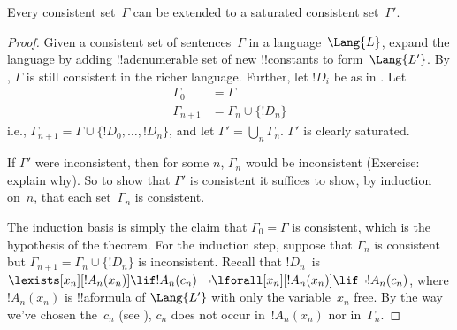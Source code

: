 \documentclass[../../../include/open-logic-section]{subfiles}
\begin{document}
\begin{lem}
Every consistent set~$\Gamma$ can be extended to a saturated
consistent set~$\Gamma'$.
\end{lem}

\begin{proof}
Given a consistent set of sentences~$\Gamma$ in a language~$\Lang{L}$,
expand the language by adding !!a{denumerable} set of new
!!{constant}s to form~$\Lang{L'}$.  By , $\Gamma$
is still consistent in the richer language.  Further, let $!D_i$ be as
in .  Let
\begin{align*}
\Gamma_0 & = \Gamma \\
\Gamma_{n+1} & = \Gamma_n \cup \{!D_n \}
\end{align*}
i.e., $\Gamma_{n+1} = \Gamma \cup \{ !D_0, \dots, !D_n \}$, and let
$\Gamma' = \bigcup_{n} \Gamma_n$.  $\Gamma'$ is clearly saturated.

If $\Gamma'$ were inconsistent, then for some $n$, $\Gamma_n$ would be
inconsistent (Exercise: explain why).  So to show that $\Gamma'$ is
consistent it suffices to show, by induction on~$n$, that each
set~$\Gamma_n$ is consistent.

The induction basis is simply the claim that $\Gamma_0 = \Gamma$ is
consistent, which is the hypothesis of the theorem.  For the induction
step, suppose that $\Gamma_{n}$ is consistent but $\Gamma_{n+1} =
\Gamma_n \cup \{!D_n\}$ is inconsistent.  Recall that $!D_n$~is
{$\lexists[x_{n}][!A_{n}(x_n)] \lif !A_{n}(c_{n})$}
{$\lnot\lforall[x_{n}][!A_{n}(x_n)] \lif \lnot !A_{n}(c_{n})$},
where $!A_n(x_n)$ is !!a{formula} of $\Lang{L'}$ with only the
variable~$x_n$ free. By the way we've chosen the~$c_n$ (see
), $c_n$ does not occur in~$!A_n(x_n)$ nor
in~$\Gamma_n$.


\end{proof}
\end{document}
